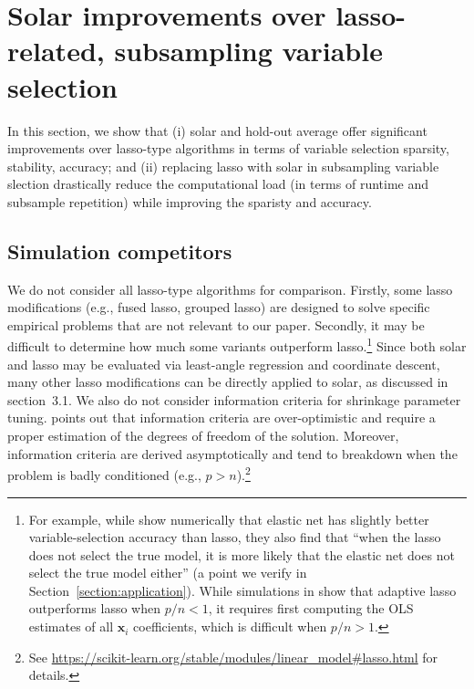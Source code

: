 \documentclass[12pt]{article}
\begin{document}

\section{Solar improvements over lasso-related, subsampling variable selection\label{section:comp}}

In this section, we show that (i) solar and hold-out average offer significant improvements over lasso-type algorithms in terms of variable selection sparsity, stability, accuracy; and (ii) replacing lasso with solar in subsampling variable slection drastically reduce the computational load (in terms of runtime and subsample repetition) while improving the sparisty and accuracy.

\subsection{Simulation competitors}

We do not consider all lasso-type algorithms for comparison. Firstly, some lasso modifications (e.g., fused lasso, grouped lasso) are designed to solve specific empirical problems that are not relevant to our paper. Secondly, it may be difficult to determine how much some variants outperform lasso.\footnote{For example, while \citet{jia2010model} show numerically that elastic net has slightly better variable-selection accuracy than lasso, they also find that ``when the lasso does not select the true model, it is more likely that the elastic net does not select the true model either'' (a point we verify in Section~\ref{section:application}). While simulations in \citet{zou2006adaptive} show that adaptive lasso outperforms lasso when $p/n<1$, it requires first computing the OLS estimates of all $\mathbf{x}_i$ coefficients, which is difficult when $p/n>1$.} Since both solar and lasso may be evaluated via least-angle regression and coordinate descent, many other lasso modifications can be directly applied to solar, as discussed in section~3.1. We also do not consider information criteria for shrinkage parameter tuning. \citet{scikit-learn} points out that information criteria are over-optimistic and require a proper estimation of the degrees of freedom of the solution. Moreover, information criteria are derived asymptotically and tend to breakdown when the problem is badly conditioned (e.g., $p > n$).\footnote{See \url{https://scikit-learn.org/stable/modules/linear_model\#lasso.html} for details.}
\end{document}
